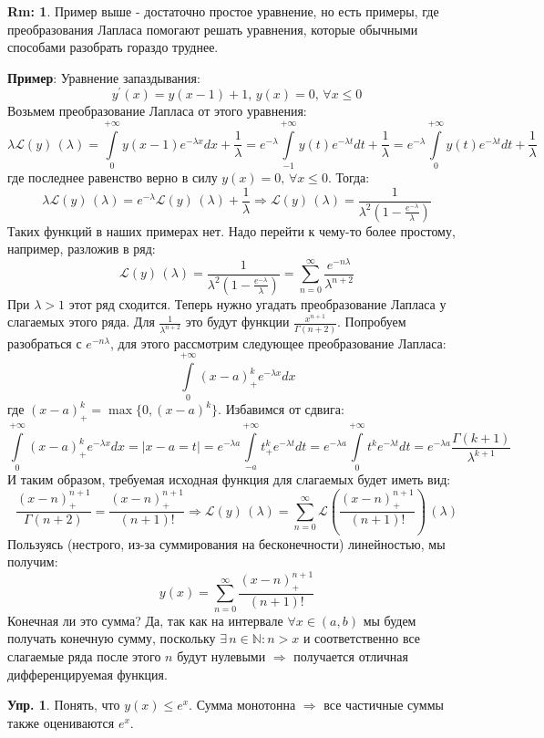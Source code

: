 \documentclass[12pt]{article}
\newcommand{\MN}{\mathbb{N}}
\newcommand{\ML}{\mathcal{L}}
\theoremstyle{definition}
\newtheorem{rem}{Rm:}
\newtheorem{exrc}{Упр.}
\newcommand{\ddint}[2]{\displaystyle\int\limits_{#1}^{#2}}
\begin{document}
\begin{rem}
	Пример выше - достаточно простое уравнение, но есть примеры, где преобразования Лапласа помогают решать уравнения, которые обычными способами разобрать гораздо труднее.
\end{rem}
\textbf{Пример}: Уравнение запаздывания:
$$
	y^\prime(x) = y(x - 1) + 1, \, y(x) = 0, \, \forall x \leq 0
$$
Возьмем преобразование Лапласа от этого уравнения:
$$
	\lambda\ML(y)\, (\lambda) = \ddint{0}{+\infty}y(x-1)e^{-\lambda x}dx + \dfrac{1}{\lambda} = e^{-\lambda} \ddint{-1}{+\infty}y(t)e^{-\lambda t}dt + \dfrac{1}{\lambda} =  e^{-\lambda} \ddint{0}{+\infty}y(t)e^{-\lambda t}dt + \dfrac{1}{\lambda}
$$
где последнее равенство верно в силу $y(x) = 0, \, \forall x \leq 0$. Тогда:
$$
	\lambda\ML(y)\, (\lambda) = e^{-\lambda}\ML(y)\, (\lambda) + \dfrac{1}{\lambda} \Rightarrow \ML(y)\, (\lambda) = \dfrac{1}{\lambda^2\left(1 - \tfrac{e^{-\lambda}}{\lambda}\right)}
$$
Таких функций в наших примерах нет. Надо перейти к чему-то более простому, например, разложив в ряд:
$$
	\ML(y)\, (\lambda) = \dfrac{1}{\lambda^2\left(1 - \tfrac{e^{-\lambda}}{\lambda}\right)} = \sum\limits_{n = 0}^{\infty}\dfrac{e^{-n\lambda}}{\lambda^{n + 2}}
$$
При $\lambda > 1$ этот ряд сходится. Теперь нужно угадать преобразование Лапласа у слагаемых этого ряда. Для $\tfrac{1}{\lambda^{n+2}}$ это будут функции $\tfrac{x^{n+1}}{\Gamma(n+2)}$. Попробуем разобраться с $e^{- n\lambda}$, для этого рассмотрим следующее преобразование Лапласа:
$$
	\ddint{0}{+\infty}(x-a)^k_{+}e^{-\lambda x}dx 
$$
где $(x-a)^k_{+} = \max\{0, (x-a)^k\}$. Избавимся от сдвига:
$$
	\ddint{0}{+\infty}(x-a)^k_{+}e^{-\lambda x}dx = |x-a = t| = e^{-\lambda a}\ddint{-a}{+\infty}t^k_{+}e^{-\lambda t}dt = e^{-\lambda a}\ddint{0}{+\infty}t^ke^{-\lambda t}dt = e^{-\lambda a}\dfrac{\Gamma(k+1)}{\lambda^{k+1}}
$$
И таким образом, требуемая исходная функция для слагаемых будет иметь вид: 
$$
	\dfrac{(x - n)_{+}^{n+1}}{\Gamma(n+2)} = \dfrac{(x - n)_{+}^{n+1}}{(n+1)!} \Rightarrow \ML(y)\, (\lambda) = \sum\limits_{n = 0}^{\infty}\ML\left(\dfrac{(x - n)_{+}^{n+1}}{(n+1)!}\right)\, (\lambda)
$$
Пользуясь (нестрого, из-за суммирования на бесконечности) линейностью, мы получим:
$$
	y(x) = \sum\limits_{n = 0}^{\infty}\dfrac{(x - n)_{+}^{n+1}}{(n+1)!}
$$
Конечная ли это сумма? Да, так как на интервале $\forall x \in (a,b)$ мы будем получать конечную сумму, поскольку $\exists \, n\in \MN \colon n > x$ и соответственно все слагаемые ряда после этого $n$ будут нулевыми $\Rightarrow$ получается отличная дифференцируемая функция.
\begin{exrc}
	Понять, что $y(x) \leq e^x$. Сумма монотонна $\Rightarrow$ все частичные суммы также оцениваются $e^x$.
\end{exrc}
\end{document}

